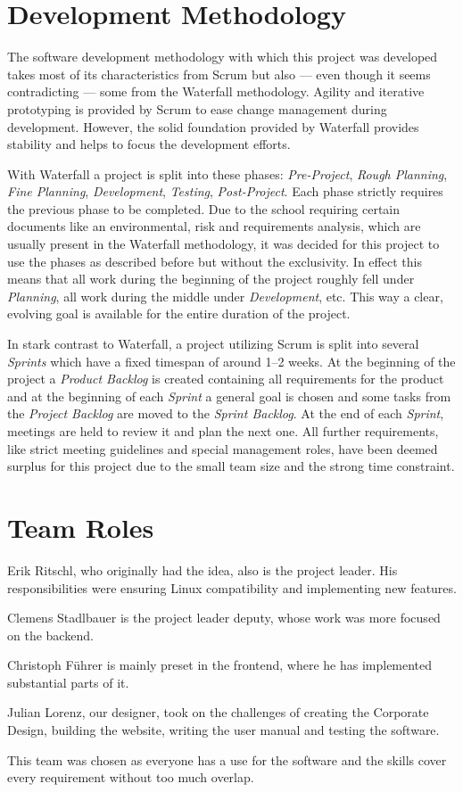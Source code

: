 \section{Development Methodology}
\def\kapitelautor{Clemens Stadlbauer}

The software development methodology with which this project was developed takes
most of its characteristics from Scrum but also --- even though it seems
contradicting --- some from the Waterfall methodology. Agility and iterative
prototyping is provided by Scrum to ease change management during development.
However, the solid foundation provided by Waterfall provides stability and
helps to focus the development efforts.

With Waterfall a project is split into these phases: \emph{Pre-Project},
\emph{Rough Planning}, \emph{Fine Planning}, \emph{Development},
\emph{Testing}, \emph{Post-Project}. Each phase strictly requires the previous
phase to be completed.
Due to the school requiring certain documents like an environmental, risk and
requirements analysis, which are usually present in the Waterfall methodology,
it was decided for this project to use the phases as described before but
without the exclusivity. In effect this means that all work during the
beginning of the project roughly fell under \emph{Planning}, all work during
the middle under \emph{Development}, etc. This way a clear, evolving goal is
available for the entire duration of the project.

In stark contrast to Waterfall, a project utilizing Scrum is split into several
\emph{Sprints} which have a fixed timespan of around 1--2
weeks. At the beginning of the project a \emph{Product Backlog} is created
containing all requirements for the product and at the beginning of each
\emph{Sprint} a general goal is chosen and some tasks from the \emph{Project
Backlog} are moved to the \emph{Sprint Backlog}. At the end of each
\emph{Sprint}, meetings are held to review it and plan the next one.  All
further requirements, like strict meeting guidelines and special management
roles, have been deemed surplus for this project due to the small team size and
the strong time constraint.

\section{Team Roles}
\def\kapitelautor{Clemens Stadlbauer}

Erik Ritschl, who originally had the idea, %
also is the project leader. His responsibilities were ensuring Linux
compatibility and implementing new features.

Clemens Stadlbauer is the project leader deputy, whose work was more focused on
the backend.

Christoph Führer is mainly preset in the frontend, where he has implemented
substantial parts of it.

Julian Lorenz, our designer, took on the challenges of creating the Corporate
Design, building the website, writing the user manual and testing the software.

This team was chosen as everyone has a use for the software and the skills
cover every requirement without too much overlap.
